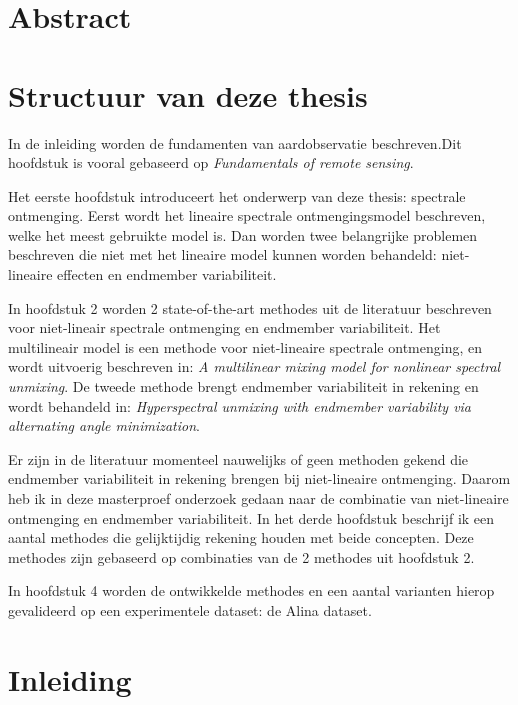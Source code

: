 \documentclass[12pt]{report}
\begin{document}
\newpage
\chapter*{Abstract}



\newpage
\chapter*{Structuur van deze thesis}
 In de inleiding worden de fundamenten van aardobservatie beschreven.Dit hoofdstuk is vooral gebaseerd op 
\textit{Fundamentals of remote sensing\cite{fun}}.

Het eerste hoofdstuk introduceert het onderwerp van deze thesis: spectrale ontmenging. Eerst wordt het lineaire spectrale ontmengingsmodel beschreven, welke het meest gebruikte model is. Dan worden twee belangrijke problemen beschreven die niet met het lineaire model kunnen worden behandeld: niet-lineaire effecten en endmember variabiliteit.

In hoofdstuk 2 worden 2 state-of-the-art methodes uit de literatuur beschreven voor niet-lineair spectrale ontmenging en endmember variabiliteit.  Het multilineair model is een methode voor niet-lineaire spectrale ontmenging, en wordt uitvoerig beschreven in: \textit{A multilinear mixing model for nonlinear spectral unmixing}\cite{mlinmix}. De tweede methode brengt  endmember variabiliteit in rekening en wordt behandeld in: \textit{Hyperspectral unmixing with endmember variability via alternating angle minimization}\cite{mesma}.

Er zijn in de literatuur momenteel nauwelijks of geen methoden gekend die endmember variabiliteit in rekening brengen bij niet-lineaire ontmenging. Daarom heb ik in deze masterproef onderzoek gedaan naar de combinatie van niet-lineaire ontmenging en endmember variabiliteit. In het derde hoofdstuk beschrijf ik een aantal methodes die gelijktijdig rekening houden met beide concepten. Deze methodes zijn gebaseerd op combinaties van de 2 methodes uit hoofdstuk 2.
	
In hoofdstuk 4 worden de ontwikkelde methodes en een aantal varianten hierop gevalideerd  op een experimentele dataset: de Alina dataset\cite{Alina}.  
\newpage
\chapter*{Inleiding}
\end{document}
